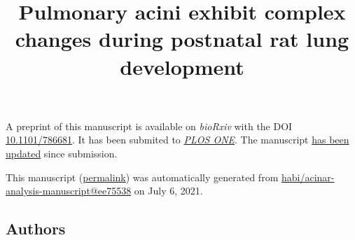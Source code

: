 \documentclass[
  american,
]{article}
\title{Pulmonary acini exhibit complex changes during postnatal rat lung development}
\author{}
\date{}
\begin{document}
\maketitle

A preprint of this manuscript is available on \emph{bioRxiv} with the DOI \href{https://doi.org/10.1101/786681}{10.1101/786681}.
It has been submited to \href{https://journals.plos.org/plosone/}{\emph{PLOS ONE}}.
The manuscript \href{https://github.com/habi/acinar-analysis-manuscript/compare/5e778036e316c47b8bac4ce50086b191a7e3707a...ee755381aa3d6b20245ee2cd1fae56dc108d7d30}{has been updated} since submission.

This manuscript
(\href{https://habi.github.io/acinar-analysis-manuscript/v/ee755381aa3d6b20245ee2cd1fae56dc108d7d30/}{permalink})
was automatically generated
from \href{https://github.com/habi/acinar-analysis-manuscript/tree/ee755381aa3d6b20245ee2cd1fae56dc108d7d30}{habi/acinar-analysis-manuscript@ee75538}
on July 6, 2021.

\hypertarget{authors}{%
\subsection{Authors}\label{authors}}
\end{document}
